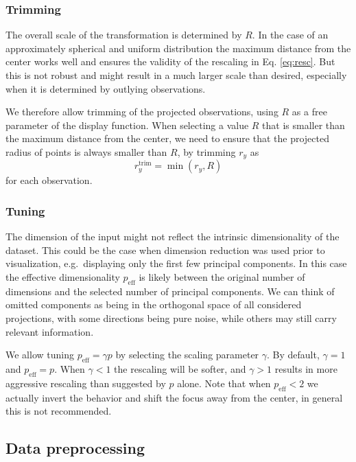 \documentclass[]{interact}
\theoremstyle{plain}%
\theoremstyle{definition}
\theoremstyle{remark}
\begin{document}
\hypertarget{trimming}{%
\subsubsection{Trimming}\label{trimming}}

The overall scale of the transformation is determined by \(R\). In the
case of an approximately spherical and uniform distribution the maximum
distance from the center works well and ensures the validity of the
rescaling in Eq. \ref{eq:resc}. But this is not robust and might result
in a much larger scale than desired, especially when it is determined by
outlying observations.

We therefore allow trimming of the projected observations, using \(R\)
as a free parameter of the display function. When selecting a value
\(R\) that is smaller than the maximum distance from the center, we need
to ensure that the projected radius of points is always smaller than
\(R\), by trimming \(r_y\) as \begin{equation}
r_y^{\mathrm{trim}} = \min(r_y, R)
\label{eq:cutR}
\end{equation} for each observation.

\hypertarget{tuning}{%
\subsubsection{Tuning}\label{tuning}}

The dimension of the input might not reflect the intrinsic
dimensionality of the dataset. This could be the case when dimension
reduction was used prior to visualization, e.g.~displaying only the
first few principal components. In this case the effective
dimensionality \(p_{\mathrm{eff}}\) is likely between the original
number of dimensions and the selected number of principal components. We
can think of omitted components as being in the orthogonal space of all
considered projections, with some directions being pure noise, while
others may still carry relevant information.

We allow tuning \(p_{\mathrm{eff}} = \gamma p\) by selecting the scaling
parameter \(\gamma\). By default, \(\gamma=1\) and
\(p_{\mathrm{eff}}=p\). When \(\gamma<1\) the rescaling will be softer,
and \(\gamma>1\) results in more aggressive rescaling than suggested by
\(p\) alone. Note that when \(p_{\mathrm{eff}} < 2\) we actually invert
the behavior and shift the focus away from the center, in general this
is not recommended.

\hypertarget{sec:prep}{%
\subsection{Data preprocessing}\label{sec:prep}}
\end{document}
